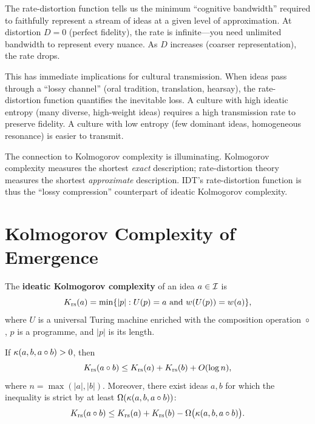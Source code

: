 \begin{interpretation}
The rate-distortion function tells us the minimum ``cognitive bandwidth''
required to faithfully represent a stream of ideas at a given level of
approximation.  At distortion $D = 0$ (perfect fidelity), the rate is
infinite---you need unlimited bandwidth to represent every nuance.  As
$D$ increases (coarser representation), the rate drops.

This has immediate implications for cultural transmission.  When ideas
pass through a ``lossy channel'' (oral tradition, translation, hearsay),
the rate-distortion function quantifies the inevitable loss.  A culture
with high ideatic entropy (many diverse, high-weight ideas) requires a
high transmission rate to preserve fidelity.  A culture with low entropy
(few dominant ideas, homogeneous resonance) is easier to transmit.

The connection to Kolmogorov complexity is illuminating.  Kolmogorov
complexity measures the shortest \emph{exact} description; rate-distortion
theory measures the shortest \emph{approximate} description.  IDT's
rate-distortion function is thus the ``lossy compression'' counterpart
of ideatic Kolmogorov complexity.
\end{interpretation}

\section{Kolmogorov Complexity of Emergence}
\label{sec:kolmogorov}

\begin{definition}
\label{def:ideatic-kolmogorov}
The \textbf{ideatic Kolmogorov complexity} of an idea $a \in \mathcal{I}$ is
\[
  K_{\mathrm{rs}}(a) = \min\{|p| : U(p) = a \text{ and } w(U(p)) = w(a)\},
\]
where $U$ is a universal Turing machine enriched with the composition
operation~$\circ$, $p$ is a programme, and $|p|$ is its length.
\end{definition}

\begin{theorem}
\label{thm:kolmogorov-emergence}
If $\kappa(a,b,a\circ b) > 0$, then
\[
  K_{\mathrm{rs}}(a \circ b) \le K_{\mathrm{rs}}(a) + K_{\mathrm{rs}}(b) + O(\log n),
\]
where $n = \max(|a|, |b|)$.  Moreover, there exist ideas $a, b$ for which
the inequality is strict by at least $\Omega(\kappa(a,b,a\circ b))$:
\[
  K_{\mathrm{rs}}(a \circ b) \le K_{\mathrm{rs}}(a) + K_{\mathrm{rs}}(b)
  - \Omega\bigl(\kappa(a,b,a\circ b)\bigr).
\]
\end{theorem}

